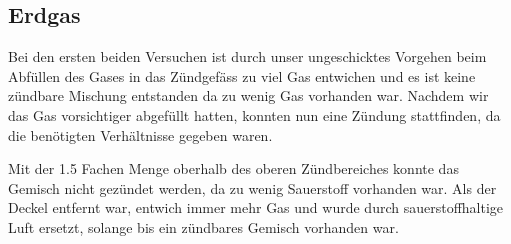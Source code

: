 \documentclass[11pt,paper=a4,final]{scrartcl}
\begin{document}
\subsection{Erdgas}
Bei den ersten beiden Versuchen ist durch unser ungeschicktes Vorgehen beim
Abf\"ullen des Gases in das Z\"undgef\"ass zu viel Gas entwichen und es ist
keine z\"undbare Mischung entstanden da zu wenig Gas vorhanden war. Nachdem wir
das Gas vorsichtiger abgef\"ullt hatten, konnten nun eine Z\"undung stattfinden,
da die ben\"otigten Verh\"altnisse gegeben waren.

Mit der 1.5 Fachen Menge oberhalb des oberen Z\"undbereiches konnte das Gemisch
nicht gez\"undet werden, da zu wenig Sauerstoff vorhanden war. Als der Deckel
entfernt war, entwich immer mehr Gas und wurde durch sauerstoffhaltige Luft
ersetzt, solange bis ein z\"undbares Gemisch vorhanden war.


\newpage
\listoftables
{}

\end{document}
